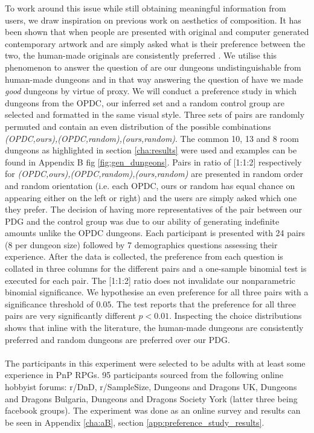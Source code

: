 \documentclass{UoYCSproject}
\begin{document}
To work around this issue while still obtaining meaningful information from users, we draw inspiration on previous work on aesthetics of composition. It has been shown that when people are presented with original and computer generated contemporary artwork and are simply asked what is their preference between the two, the human-made originals are consistently preferred \parencite{McManusMondrian, FurnhamMondrian}. We utilise this phenomenon to answer the question of are our dungeons undistinguishable from human-made dungeons and in that way answering the question of have we made \textit{good} dungeons by virtue of proxy. We will conduct a preference study in which dungeons from the OPDC, our inferred set and a random control group are selected and formatted in the same visual style. Three sets of pairs are randomly permuted and contain an even distribution of the possible combinations \textit{(OPDC,ours),(OPDC,random),(ours,random)}.
The common 10, 13 and 8 room dungeons as highlighted in section \ref{cha:results} were used and examples can be found in Appendix B fig \ref{fig:gen_dungeons}. Pairs in ratio of [1:1:2] respectively for \textit{(OPDC,ours),(OPDC,random),(ours,random)} are presented in random order and random orientation (i.e. each OPDC, ours or random has equal chance on appearing either on the left or right) and the users are simply asked which one they prefer. The decision of having more representatives of the pair between our PDG and the control group was due to our ability of generating indefinite amounts unlike the OPDC dungeons. Each participant is presented with 24 pairs (8 per dungeon size) followed by 7 demographics questions assessing their experience. After the data is collected, the preference from each question is collated in three columns for the different pairs and a one-sample binomial test is executed for each pair. The [1:1:2] ratio does not invalidate our nonparametric binomial significance. We hypothesise an even preference for all three pairs with a significance threshold of \(0.05\). The test reports that the preference for all three pairs are very significantly different \(p < 0.01\). Inspecting the choice distributions shows that inline with the literature, the human-made dungeons are consistently preferred and random dungeons are preferred over our PDG.


\paragraph{}
The participants in this experiment were selected to be adults with at least some experience in PnP RPGs. 95 participants sourced from the following online hobbyist forums: r/DnD, r/SampleSize, Dungeons and Dragons UK, Dungeons and Dragons Bulgaria, Dungeons and Dragons Society York (latter three being facebook groups). The experiment was done as an online survey and results can be seen in Appendix \ref{cha:aB}, section \ref{app:preference_study_results}.
\end{document}
